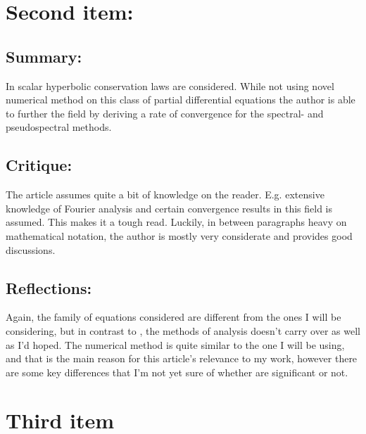 \documentclass[11pt, a4paper]{article}
\begin{document}
\section{Second item:}
\subsection{Summary:}
In \cite{Schochet} scalar hyperbolic conservation laws are considered. While not using novel numerical method on this class of partial differential equations the author is able to further the field by deriving a rate of convergence for the spectral- and pseudospectral methods.

\subsection{Critique:}
The article assumes quite a bit of knowledge on the reader. E.g. extensive knowledge of Fourier analysis and certain convergence results in this field is assumed. This makes it a tough read. Luckily, in between paragraphs heavy on mathematical notation, the author is mostly very considerate and provides good discussions.

\subsection{Reflections:}
Again, the family of equations considered are different from the ones I will be considering, but in contrast to \cite{Cifani}, the methods of analysis doesn't carry over as well as I'd hoped. The numerical method is quite similar to the one I will be using, and that is the main reason for this article's relevance to my work, however there are some key differences that I'm not yet sure of whether are significant or not.


\section{Third item}
\end{document}
